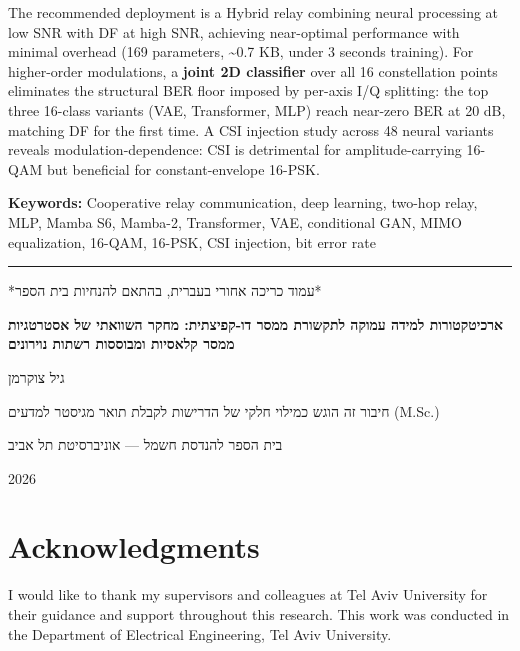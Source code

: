The recommended deployment is a Hybrid relay combining neural processing at low SNR with DF at high SNR, achieving near-optimal performance with minimal overhead (169 parameters, \textasciitilde0.7 KB, under 3 seconds training). For higher-order modulations, a \textbf{joint 2D classifier} over all 16 constellation points eliminates the structural BER floor imposed by per-axis I/Q splitting: the top three 16-class variants (VAE, Transformer, MLP) reach near-zero BER at 20 dB, matching DF for the first time. A CSI injection study across 48 neural variants reveals modulation-dependence: CSI is detrimental for amplitude-carrying 16-QAM but beneficial for constant-envelope 16-PSK.

\textbf{Keywords:} Cooperative relay communication, deep learning, two-hop relay, MLP, Mamba S6, Mamba-2, Transformer, VAE, conditional GAN, MIMO equalization, 16-QAM, 16-PSK, CSI injection, bit error rate

\begin{center}\rule{0.5\linewidth}{0.5pt}\end{center}

\begin{flushright}
\begin{otherlanguage}{hebrew}
*עמוד כריכה אחורי בעברית, בהתאם להנחיות בית הספר*

\textbf{ארכיטקטורות למידה עמוקה לתקשורת ממסר דו-קפיצתית: מחקר השוואתי של אסטרטגיות ממסר קלאסיות ומבוססות רשתות נוירונים}

גיל צוקרמן

חיבור זה הוגש כמילוי חלקי של הדרישות לקבלת תואר מגיסטר למדעים (M.Sc.)

בית הספר להנדסת חשמל — אוניברסיטת תל אביב

2026
\end{otherlanguage}
\end{flushright}

\clearpage

\cleardoublepage
{}
\chapter*{Acknowledgments}

I would like to thank my supervisors and colleagues at Tel Aviv University for their guidance and support throughout this research. This work was conducted in the Department of Electrical Engineering, Tel Aviv University.


